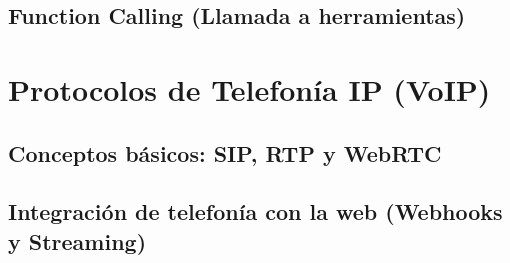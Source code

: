 \textoBase

\subsection{Function Calling (Llamada a herramientas)}
\label{subsec:function_calling}

\textoBaseAlt

\section{Protocolos de Telefonía IP (VoIP)}
\label{sec:voip}

\textoBase

\subsection{Conceptos básicos: SIP, RTP y WebRTC}
\label{subsec:sip_rtp_webrtc}

\textoBaseAlt

\subsection{Integración de telefonía con la web (Webhooks y Streaming)}
\label{subsec:telefonia_web}

\textoBase
